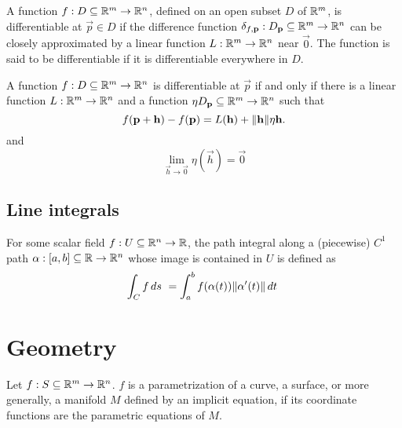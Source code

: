\documentclass{article}
\begin{document}
\begin{definition}
    A function $f: D \subseteq \mathbb{R}^m \rightarrow \mathbb{R}^n$, defined on an open subset $D$
    of $\mathbb{R}^m$, is differentiable at $\vec{p} \in D$ if the difference function
    $\delta_{f, \mathbf{p}} : D_{\mathbf{p}} \subseteq \mathbb{R}^m \rightarrow \mathbb{R}^n$ can be closely
    approximated by a linear function $L: \mathbb{R}^m \rightarrow \mathbb{R}^n$ near $\vec{0}$. The function
    is said to be differentiable if it is differentiable everywhere in $D$.
\end{definition}

\begin{theorem}
    A function $f: D \subseteq \mathbb{R}^m \rightarrow \mathbb{R}^n$ is differentiable
    at $\vec{p}$ if and only if there is a linear function $L: \mathbb{R}^m \rightarrow \mathbb{R}^n$
    and a function $\eta D_{\mathbf{p}} \subseteq \mathbb{R}^m \rightarrow \mathbb{R}^n$ such that
    \begin{equation*}
        f(\mathbf{p} + \mathbf{h}) - f(\mathbf{p}) = L(\mathbf{h}) + \lVert\mathbf{h}\rVert\eta{\mathbf{h}}.
    \end{equation*}
    and
    \begin{equation*}
        \lim_{\vec{h} \rightarrow \vec{0}} \eta(\vec{h}) = \vec{0}
    \end{equation*}
\end{theorem}
\subsection{Line integrals}
\begin{definition}
    For some scalar field $f: U \subseteq \mathbb{R}^n \rightarrow \mathbb{R}$,
    the path integral along a (piecewise) $C^1$ path $\alpha: [a, b] \subseteq \mathbb{R} \rightarrow \mathbb{R}^n$
    whose image is contained in $U$ is defined as
    \begin{equation*}
        \int_{C} f \, ds\ =\int_{a}^{b} f(\alpha(t))\norm{\alpha'(t)} \, dt\
    \end{equation*}
\end{definition}

\section{Geometry}
\begin{definition}[Parametrization]
    Let $f: S \subseteq \mathbb{R}^m \rightarrow \mathbb{R}^n$. $f$ is a
    parametrization of a curve, a surface, or more generally, a manifold $M$
    defined by an implicit equation, if its coordinate functions are the parametric equations
    of $M$.
\end{definition}
\end{document}
